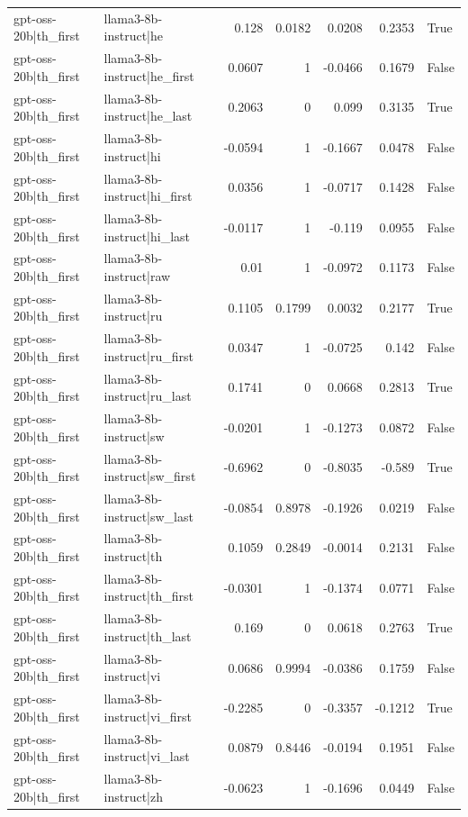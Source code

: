 \begin{table}
\begin{tabular}{l l r r r r l}
gpt-oss-20b|th_first & llama3-8b-instruct|he & 0.128 & 0.0182 & 0.0208 & 0.2353 & True \\
gpt-oss-20b|th_first & llama3-8b-instruct|he_first & 0.0607 & 1 & -0.0466 & 0.1679 & False \\
gpt-oss-20b|th_first & llama3-8b-instruct|he_last & 0.2063 & 0 & 0.099 & 0.3135 & True \\
gpt-oss-20b|th_first & llama3-8b-instruct|hi & -0.0594 & 1 & -0.1667 & 0.0478 & False \\
gpt-oss-20b|th_first & llama3-8b-instruct|hi_first & 0.0356 & 1 & -0.0717 & 0.1428 & False \\
gpt-oss-20b|th_first & llama3-8b-instruct|hi_last & -0.0117 & 1 & -0.119 & 0.0955 & False \\
gpt-oss-20b|th_first & llama3-8b-instruct|raw & 0.01 & 1 & -0.0972 & 0.1173 & False \\
gpt-oss-20b|th_first & llama3-8b-instruct|ru & 0.1105 & 0.1799 & 0.0032 & 0.2177 & True \\
gpt-oss-20b|th_first & llama3-8b-instruct|ru_first & 0.0347 & 1 & -0.0725 & 0.142 & False \\
gpt-oss-20b|th_first & llama3-8b-instruct|ru_last & 0.1741 & 0 & 0.0668 & 0.2813 & True \\
gpt-oss-20b|th_first & llama3-8b-instruct|sw & -0.0201 & 1 & -0.1273 & 0.0872 & False \\
gpt-oss-20b|th_first & llama3-8b-instruct|sw_first & -0.6962 & 0 & -0.8035 & -0.589 & True \\
gpt-oss-20b|th_first & llama3-8b-instruct|sw_last & -0.0854 & 0.8978 & -0.1926 & 0.0219 & False \\
gpt-oss-20b|th_first & llama3-8b-instruct|th & 0.1059 & 0.2849 & -0.0014 & 0.2131 & False \\
gpt-oss-20b|th_first & llama3-8b-instruct|th_first & -0.0301 & 1 & -0.1374 & 0.0771 & False \\
gpt-oss-20b|th_first & llama3-8b-instruct|th_last & 0.169 & 0 & 0.0618 & 0.2763 & True \\
gpt-oss-20b|th_first & llama3-8b-instruct|vi & 0.0686 & 0.9994 & -0.0386 & 0.1759 & False \\
gpt-oss-20b|th_first & llama3-8b-instruct|vi_first & -0.2285 & 0 & -0.3357 & -0.1212 & True \\
gpt-oss-20b|th_first & llama3-8b-instruct|vi_last & 0.0879 & 0.8446 & -0.0194 & 0.1951 & False \\
gpt-oss-20b|th_first & llama3-8b-instruct|zh & -0.0623 & 1 & -0.1696 & 0.0449 & False \\

\end{tabular}
\end{table}
